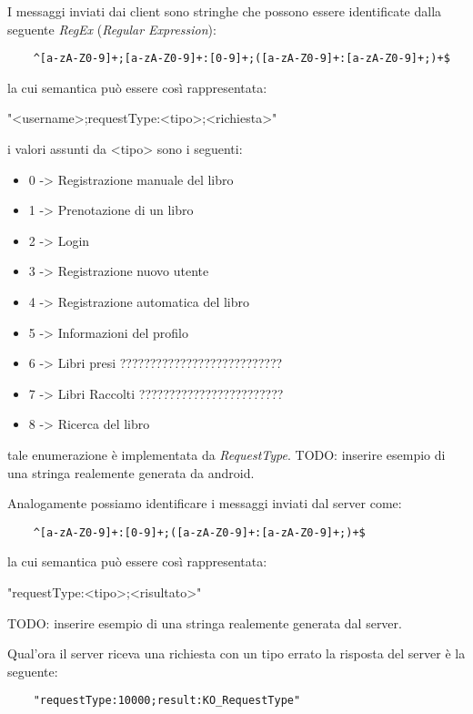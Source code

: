 I messaggi inviati dai client sono stringhe che possono essere identificate dalla seguente \textit{RegEx} (\textit{Regular Expression}): 
\begin{center}
	\begin{lstlisting}
	^[a-zA-Z0-9]+;[a-zA-Z0-9]+:[0-9]+;([a-zA-Z0-9]+:[a-zA-Z0-9]+;)+$
	\end{lstlisting}
\end{center}
la cui semantica può essere così rappresentata:
\begin{center}
"<username>;requestType:<tipo>;<richiesta>"
\end{center}
i valori assunti da <tipo> sono i seguenti:
\begin{itemize}
	\item 0 -> Registrazione manuale del libro
	\item 1 -> Prenotazione di un libro	
	\item 2 -> Login
	\item 3 -> Registrazione nuovo utente
	\item 4 -> Registrazione automatica del libro
	\item 5 -> Informazioni del profilo
	\item 6 -> Libri presi ???????????????????????????
	\item 7 -> Libri Raccolti ????????????????????????
	\item 8 -> Ricerca del libro
\end{itemize}
tale enumerazione è implementata da \textit{RequestType}.
TODO: inserire esempio di una stringa realemente generata da android.


Analogamente possiamo identificare i messaggi inviati dal server come:
\begin{center}
	\begin{lstlisting}
	^[a-zA-Z0-9]+:[0-9]+;([a-zA-Z0-9]+:[a-zA-Z0-9]+;)+$
	\end{lstlisting}
\end{center}
la cui semantica può essere così rappresentata:
\begin{center}
	"requestType:<tipo>;<risultato>"
\end{center}
TODO: inserire esempio di una stringa realemente generata dal server.


Qual'ora il server riceva una richiesta con un tipo errato la risposta del server è la seguente:
\begin{center}
	\begin{lstlisting}
	"requestType:10000;result:KO_RequestType"
	\end{lstlisting}
\end{center}




